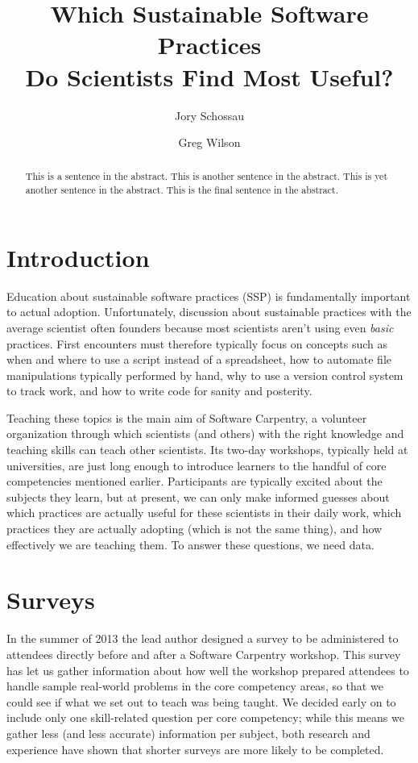 \documentclass[submission,copyright,creativecommons]{eptcs}
\title{Which Sustainable Software Practices\\ Do Scientists Find Most Useful?}
\author{
    Jory Schossau
    \institute{Michigan State University}
    \email{jory@msu.edu}
    \and
    Greg Wilson
    \institute{Software Carpentry}
    \email{gvwilson@software-carpentry.org}
}
\begin{document}
\maketitle

\begin{abstract}
This is a sentence in the abstract.
This is another sentence in the abstract.
This is yet another sentence in the abstract.
This is the final sentence in the abstract.
\end{abstract}

\section{Introduction}

Education about sustainable software practices (SSP)
is fundamentally important to actual adoption.
Unfortunately,
discussion about sustainable practices with the average scientist often founders
because most scientists aren't using even \textit{basic} practices.
First encounters must therefore typically focus on concepts such as
when and where to use a script instead of a spreadsheet,
how to automate file manipulations typically performed by hand,
why to use a version control system to track work,
and how to write code for sanity and posterity.

Teaching these topics is the main aim of Software Carpentry,
a volunteer organization through which scientists (and others)
with the right knowledge and teaching skills can teach other scientists.
Its two-day workshops,
typically held at universities,
are just long enough to introduce learners to the handful of core competencies mentioned earlier.
Participants are typically excited about the subjects they learn,
but at present,
we can only make informed guesses about
which practices are actually useful for these scientists in their daily work,
which practices they are actually adopting (which is not the same thing),
and how effectively we are teaching them.
To answer these questions,
we need data.

\section{Surveys}

In the summer of 2013
the lead author designed a survey
to be administered to attendees directly before and after a Software Carpentry workshop.
This survey has let us gather information about
how well the workshop prepared attendees to handle sample real-world problems in the core competency areas,
so that we could see if what we set out to teach was being taught.
We decided early on to include only one skill-related question per core competency;
while this means we gather less (and less accurate) information per subject,
both research and experience have shown that shorter surveys are more likely to be completed.
\end{document}
